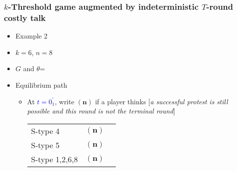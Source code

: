 \documentclass[9pt]{beamer}
\begin{document}
\begin{frame}
  \frametitle{$k$-Threshold game augmented by indeterministic $T$-round costly talk}

\begin{itemize}
\item Example 2
\item $k=6$, $n=8$
\item $G$ and $\theta$=
\begin{center}
\end{center}
\end{itemize}

\begin{itemize}
\item Equilibrium path
\begin{itemize}
\item 
{
At \textcolor{blue}{$t=0^{'}_1$}, write $({\textbf{n}})$ if a player thinks \alert{[}\textit{a successful protest is still possible and this round is not the terminal round}\alert{]}
\begin{table}[h]
\begin{tabular}{ll l}
S-type 4 & $({\textbf{n}})$\\
S-type 5 & $({\textbf{n}})$\\
S-type 1,2,6,8 & $({\textbf{n}})$
\end{tabular}
\end{table}
}

\end{itemize}

\end{itemize}

\end{frame}
\end{document}
